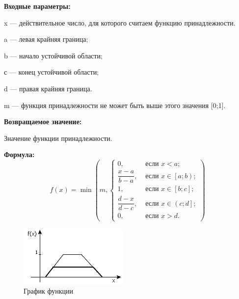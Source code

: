 \textbf{Входные параметры:}
  
x --- действительное число, для которого считаем функцию принадлежности.
 
a --- левая крайняя граница;
 
b --- начало устойчивой области;
 
с --- конец устойчивой области;
 
d --- правая крайняя граница.

m --- функция принадлежности не может быть выше этого значения [0;1].

\textbf{Возвращаемое значение:}
 
Значение функции принадлежности.

\textbf{Формула:}
\begin{equation*}
f\left(x \right)=\min\left(m, \left\lbrace \begin{aligned}  0,& \text{ если } x < a   ; \\\dfrac{x-a}{b-a},& \text{ если } x \in \left[ a; b\right)   ; \\1,& \text{ если } x \in \left[ b; c\right] ; \\\dfrac{d-x}{d-c},& \text{ если } x \in \left( c; d\right]   ; \\ 0,& \text{ если } x >d. \end{aligned}\right.\right) 
\end{equation*}

 \begin{figure} [h] 
   \center
   \includegraphics {MHL_TrapeziformTruncatedFuzzyNumber_Graph.png}
   \caption{График функции} 
   \label{img:MHL_TrapeziformTruncatedFuzzyNumber_Graph}  
 \end{figure}
